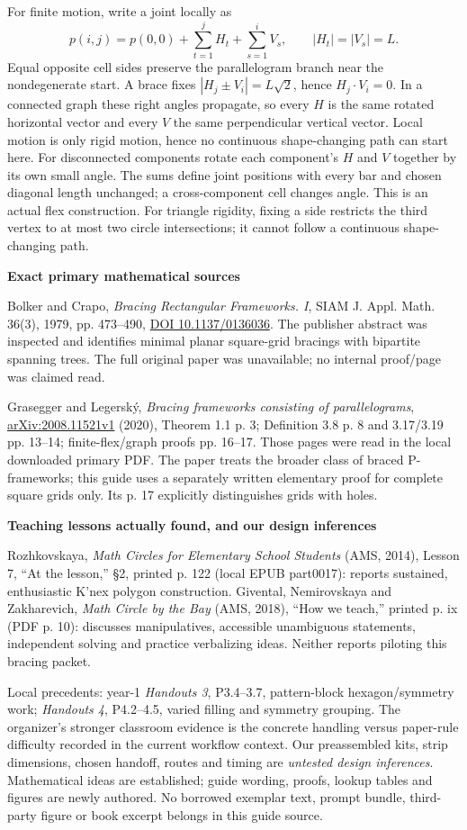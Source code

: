 \documentclass[letterpaper,11pt]{article}
\newcommand{\sub}[1]{\par\textbf{#1}\par}
\begin{document}
For finite motion, write a joint locally as
\[
p(i,j)=p(0,0)+\sum_{t=1}^{j}H_t+\sum_{s=1}^{i}V_s,\qquad |H_t|=|V_s|=L.
\]
Equal opposite cell sides preserve the parallelogram branch near the nondegenerate start. A brace fixes $|H_j\pm V_i|=L\sqrt2$, hence $H_j\cdot V_i=0$. In a connected graph these right angles propagate, so every $H$ is the same rotated horizontal vector and every $V$ the same perpendicular vertical vector. Local motion is only rigid motion, hence no continuous shape-changing path can start here. For disconnected components rotate each component's $H$ and $V$ together by its own small angle. The sums define joint positions with every bar and chosen diagonal length unchanged; a cross-component cell changes angle. This is an actual flex construction. For triangle rigidity, fixing a side restricts the third vertex to at most two circle intersections; it cannot follow a continuous shape-changing path.

\sub{Exact primary mathematical sources}
Bolker and Crapo, \emph{Bracing Rectangular Frameworks. I}, SIAM J. Appl. Math. 36(3), 1979, pp. 473--490, \href{https://epubs.siam.org/doi/abs/10.1137/0136036}{DOI 10.1137/0136036}. The publisher abstract was inspected and identifies minimal planar square-grid bracings with bipartite spanning trees. The full original paper was unavailable; no internal proof/page was claimed read.

Grasegger and Legersk\'y, \emph{Bracing frameworks consisting of parallelograms}, \href{https://arxiv.org/abs/2008.11521v1}{arXiv:2008.11521v1} (2020), Theorem 1.1 p. 3; Definition 3.8 p. 8 and 3.17/3.19 pp. 13--14; finite-flex/graph proofs pp. 16--17. Those pages were read in the local downloaded primary PDF. The paper treats the broader class of braced P-frameworks; this guide uses a separately written elementary proof for complete square grids only. Its p. 17 explicitly distinguishes grids with holes.

\sub{Teaching lessons actually found, and our design inferences}
Rozhkovskaya, \emph{Math Circles for Elementary School Students} (AMS, 2014), Lesson 7, ``At the lesson,'' \S2, printed p. 122 (local EPUB part0017): reports sustained, enthusiastic K'nex polygon construction. Givental, Nemirovskaya and Zakharevich, \emph{Math Circle by the Bay} (AMS, 2018), ``How we teach,'' printed p. ix (PDF p. 10): discusses manipulatives, accessible unambiguous statements, independent solving and practice verbalizing ideas. Neither reports piloting this bracing packet.

Local precedents: year-1 \emph{Handouts 3}, P3.4--3.7, pattern-block hexagon/symmetry work; \emph{Handouts 4}, P4.2--4.5, varied filling and symmetry grouping. The organizer's stronger classroom evidence is the concrete handling versus paper-rule difficulty recorded in the current workflow context. Our preassembled kits, strip dimensions, chosen handoff, routes and timing are \emph{untested design inferences}. Mathematical ideas are established; guide wording, proofs, lookup tables and figures are newly authored. No borrowed exemplar text, prompt bundle, third-party figure or book excerpt belongs in this guide source.
\end{document}
